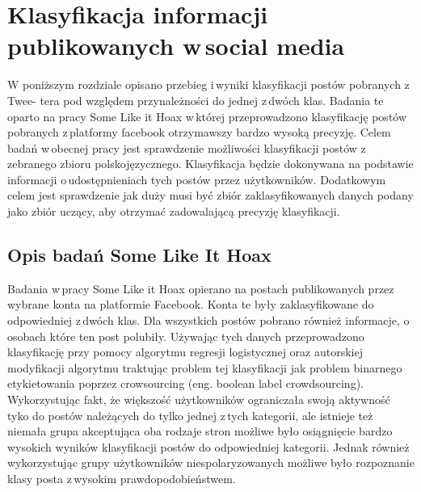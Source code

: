 \newpage
\section{Klasyfikacja informacji publikowanych w\,social media}
W poniższym rozdziale opisano przebieg i\,wyniki klasyfikacji postów pobranych z\,Twee- tera pod względem przynależności do jednej z\,dwóch klas. Badania te oparto na pracy Some Like it Hoax\cite{tacchini2017some} w\,której przeprowadzono klasyfikację postów pobranych z\,platformy facebook otrzymawszy bardzo wysoką precyzję. Celem badań w\,obecnej pracy jest sprawdzenie możliwości klasyfikacji postów z\,zebranego zbioru polskojęzycznego. Klasyfikacja będzie dokonywana na podstawie informacji o\,udostępnieniach tych postów przez użytkowników. Dodatkowym celem jest sprawdzenie jak duży musi być zbiór zaklasyfikowanych danych podany jako zbiór uczący, aby otrzymać zadowalającą precyzję klasyfikacji.
\subsection{Opis badań Some Like It Hoax}
Badania w\,pracy Some Like it Hoax opierano na postach publikowanych przez wybrane konta na platformie Facebook. Konta te były zaklasyfikowane do odpowiedniej z\,dwóch klas. Dla wszystkich postów pobrano również informacje, o\,osobach które ten post polubiły. Używając tych danych przeprowadzono klasyfikację przy pomocy algorytmu regresji logistycznej oraz autorskiej modyfikacji algorytmu traktując problem tej klasyfikacji jak problem binarnego etykietowania poprzez crowsourcing (eng. boolean label crowdsourcing).
Wykorzystując fakt, że większość użytkowników ograniczała swoją aktywność tyko do postów należących do tylko jednej z\,tych kategorii, ale istnieje też niemała grupa akceptująca oba rodzaje stron możliwe było osiągnięcie bardzo wysokich wyników klasyfikacji postów do odpowiedniej kategorii. Jednak również wykorzystując grupy użytkowników niespolaryzowanych możliwe było rozpoznanie klasy posta z\,wysokim prawdopodobieństwem.
